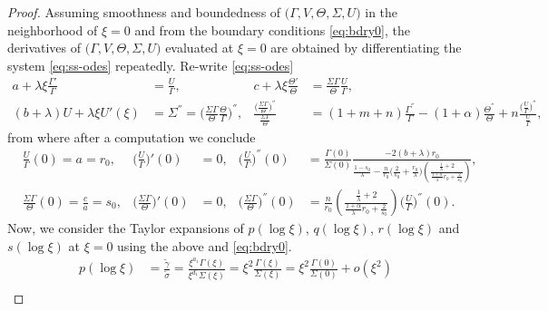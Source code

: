 \documentclass[a4paper,11pt]{article}
\def\tg{{\tilde{\gamma}}}
\def\ts{{\tilde{\sigma}}}
\theoremstyle{remark}
\begin{document}
\begin{proof}
Assuming smoothness and boundedness of $\big(\Gamma,V,\Theta,\Sigma,U\big)$ in the neighborhood of $\xi=0$ and from the boundary conditions \eqref{eq:bdry0}, the derivatives of $\big(\Gamma,V,\Theta,\Sigma,U\big)$ evaluated at $\xi=0$ are obtained by differentiating the system \eqref{eq:ss-odes} repeatedly.
Re-write \eqref{eq:ss-odes}
\begin{align*}
  a + \lambda\xi\frac{\Gamma'}{\Gamma} &= \frac{U}{\Gamma}, &
  c + \lambda\xi\frac{\Theta'}{\Theta} &= \frac{\Sigma\Gamma}{\Theta} \frac{U}{\Gamma},\\
  (b+\lambda)U  + \lambda \xi U'(\xi) &= \Sigma^{''} = \Big(\frac{\Sigma\Gamma}{\Theta} \frac{\Theta}{\Gamma}\Big)^{''}, &
  \frac{\Big(\frac{\Sigma\Gamma}{\Theta}\Big)^{''}}{\frac{\Sigma\Gamma}{\Theta}} &= (1+m+n)\frac{\Gamma^{''}}{\Gamma}-(1+\alpha) \frac{\Theta^{''}}{\Theta} + n \frac{ \big(\frac{U}{\Gamma}\big)^{''}}{\frac{U}{\Gamma}},
\end{align*}
from where after a computation we conclude
\begin{align*}
&\frac{U}{\Gamma}(0) = a = r_0,  & \Big(\frac{U}{\Gamma}\Big)'(0)&=0, & \Big(\frac{U}{\Gamma}\Big)^{''}(0) &= \frac{\Gamma(0)}{\Sigma(0)} \frac{-2(b+\lambda)r_0}{\frac{1-s_0}{\lambda}-\frac{n}{r_0}\Big(\frac{2}{s_0} + \frac{r_0}{\lambda}\Big)\left(\frac{ \frac{1}{\lambda}+2}{ \frac{1+\alpha}{\lambda}r_0 + \frac{2}{s_0}}\right)},\\
&\frac{\Sigma\Gamma}{\Theta}(0) = \frac{c}{a} = s_0,  & \Big(\frac{\Sigma\Gamma}{\Theta}\Big)'(0)&=0, &
\Big(\frac{\Sigma\Gamma}{\Theta}\Big)^{''}(0) &= \frac{n}{r_0} \left(\frac{ \frac{1}{\lambda}+2 }{ \frac{1+\alpha}{\lambda}r_0 + \frac{2}{s_0}}\right)\Big(\frac{U}{\Gamma}\Big)^{''}(0).
\end{align*}
Now, we consider the Taylor expansions of $p(\log\xi)$, $q(\log\xi)$, $r(\log\xi)$ and $s(\log\xi)$ at $\xi=0$ using the above and \eqref{eq:bdry0}.
\begin{align*}
 p(\log\xi) &= \frac{ \tg }{\ts} = \frac{ \xi^{a_1} \Gamma(\xi)}{\xi^{d_1} \Sigma(\xi)} = \xi^2\frac{\Gamma(\xi)}{\Sigma(\xi)} = \xi^2\frac{\Gamma(0)}{\Sigma(0)} + o(\xi^2) \\

\end{align*}
\end{proof}
\end{document}
